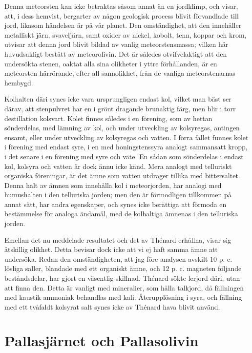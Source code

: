 \documentclass[a4paper, 12pt, oneside, swedish]{article}
\begin{document}
Denna meteorsten kan icke betraktas såsom annat än en jordklimp, och visar, att, i dess hemvist, bergarter av någon geologisk process blivit förvandlade till jord, likasom händelsen är på vår planet. Den omständighet, att den innehåller metalliskt järn, svaveljärn, samt oxider av nickel, kobolt, tenn, koppar och krom, utvisar att denna jord blivit bildad av vanlig meteorstensmassa; vilken här huvudsakligt bestått av meteorolivin. Det är således otvifvelaktigt att den undersökta stenen, oaktat alla sina olikheter i yttre förhållanden, är en meteorsten härrörande, efter all sannolikhet, från de vanliga meteorstenarnas hembygd.

Kolhalten däri synes icke vara ursprungligen endast kol, vilket man bäst ser därav, att stenpulvret har en i grönt dragande brunaktig färg, men blir i torr destillation kolsvart. Kolet finnes således i en förening, som av hettan sönderdelas, med lämning av kol, och under utveckling av kolsyregas, antingen ensamt, eller under utveckling av kolsyregas och vatten. I förra fallet funnes kolet i förening med endast syre, i en med honingstenssyra analogt sammansatt kropp, i det senare i en förening med syre och väte. En sådan som sönderdelas i endast kol, kolsyra och vatten är dock ännu icke känd. Mera analogt med telluriskt organiska föreningar, är det ämne som vatten utdrager tillika med bittersaltet. Denna halt av ämnen som innehålla kol i meteorjorden, har analogi med humushalten i den telluriska jorden; men den är förmodligen tillkommen på annat sätt, har andra egenskaper, och synes icke berättiga att förmoda en bestämmelse för analoga ändamål, med de kolhaltiga ämnenas i den telluriska jorden.

Emellan det nu meddelade resultatet och det av Thénard erhållna, visar sig åtskillig olikhet. Detta bevisar dock icke att vi ej haft samma ämne att undersöka. Redan den omständigheten, att jag före analysen avskilt 10 p. c. lösliga saller, blandade med ett organiskt ämne, och 12 p. c. magneten följande beståndsdelar, har gjort en väsentlig skillnad. Thénard sökte lerjord däri, utan att finna den. Detta är vanligt med mineralier, som hålla talkjord, då fällningen med kaustik ammoniak behandlas med kali. Återupplösning i syra, och fällning med ett tvåfaldt kolsyrat salt synes icke av Thénard hava blivit använd.
\clearpage
\section{Pallasjärnet och Pallasolivin}
\end{document}
